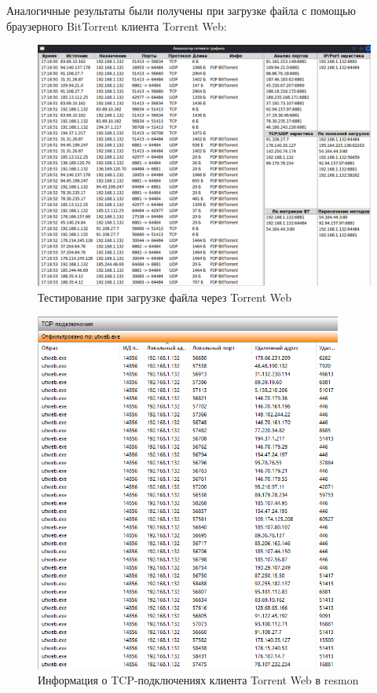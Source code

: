 \documentclass[bachelor, och, coursework]{SCWorks}
\begin{document}
Аналогичные результаты были получены при загрузке файла с помощью браузерного BitTorrent клиента \textmu Torrent Web:
\begin{figure}[H]
    \centering
    \includegraphics[width=1\textwidth]{test3.png}
    \caption{Тестирование при загрузке файла через \textmu Torrent Web}
\end{figure}

\begin{figure}[H]
    \centering
    \includegraphics[width=0.9\textwidth]{test3_resmon1.png}
    \caption{Информация о TCP-подключениях клиента \textmu Torrent Web в resmon}
    \label{test3_resmon1}
\end{figure}
\end{document}
